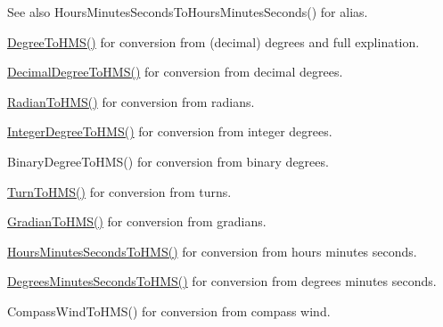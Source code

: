 \begin{DoxySeeAlso}{See also}
Hours\+Minutes\+Seconds\+To\+Hours\+Minutes\+Seconds() for alias. 

\mbox{\hyperlink{group___e_g_x_math-_angle_conversions-_degree_ga0bb223ca6e77b00439a6d910ab32d82e}{Degree\+To\+H\+M\+S()}} for conversion from (decimal) degrees and full explination. 

\mbox{\hyperlink{group___e_g_x_math-_angle_conversions-_decimal_degree_ga981b48f16766590641360ca98dfa7b8c}{Decimal\+Degree\+To\+H\+M\+S()}} for conversion from decimal degrees. 

\mbox{\hyperlink{group___e_g_x_math-_angle_conversions-_radian_ga55b5fba9307f34ab8db57391789a90cc}{Radian\+To\+H\+M\+S()}} for conversion from radians. 

\mbox{\hyperlink{group___e_g_x_math-_angle_conversions-_integer_degree_gae6b79bd5a92f8c6942b9fc2c50695e6a}{Integer\+Degree\+To\+H\+M\+S()}} for conversion from integer degrees. 

Binary\+Degree\+To\+H\+M\+S() for conversion from binary degrees. 

\mbox{\hyperlink{group___e_g_x_math-_angle_conversions-_turn_ga74efaece2f95aa6671f18382e5f3925f}{Turn\+To\+H\+M\+S()}} for conversion from turns. 

\mbox{\hyperlink{group___e_g_x_math-_angle_conversions-_gradian_ga6513a992679fbb97d2969cf8bd68306f}{Gradian\+To\+H\+M\+S()}} for conversion from gradians. 

\mbox{\hyperlink{group___e_g_x_math-_angle_conversions-_hours_minutes_seconds_ga5ac65e4e7ed8857151b3f81f5928df3a}{Hours\+Minutes\+Seconds\+To\+H\+M\+S()}} for conversion from hours minutes seconds. 

\mbox{\hyperlink{group___e_g_x_math-_angle_conversions-_degrees_minutes_seconds_ga63c1cd3c9048d0c5a80fd9bc851c38ac}{Degrees\+Minutes\+Seconds\+To\+H\+M\+S()}} for conversion from degrees minutes seconds. 

Compass\+Wind\+To\+H\+M\+S() for conversion from compass wind. 
\end{DoxySeeAlso}
\mbox{\label{group___e_g_x_math-_angle_conversions-_hours_minutes_seconds_gadf3829ca1704cfd64886a4de1b3e366f}} 
